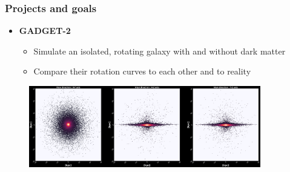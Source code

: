 \begin{frame}
\frametitle{Projects and goals}

\begin{itemize}
	\item<1-> \textbf{GADGET-2}
	\begin{itemize}
		\item<1-> Simulate an isolated, rotating galaxy with and without dark matter
		\item<1-> Compare their rotation curves to each other and to reality
	\end{itemize}
\end{itemize}
\begin{figure}
	\includegraphics[width=0.9\textwidth]{./images/galaxy_init.png}
\end{figure}

\end{frame}